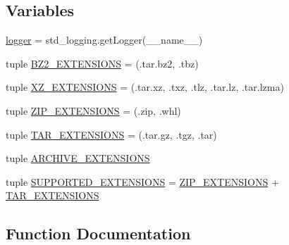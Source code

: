 \subsection*{Variables}
\begin{DoxyCompactItemize}
\item 
\hyperlink{namespacepip_1_1utils_a9d26c744a157c8ff3d40c0666790cf93}{logger} = std\+\_\+logging.\+get\+Logger(\+\_\+\+\_\+name\+\_\+\+\_\+)
\item 
tuple \hyperlink{namespacepip_1_1utils_a4b9cd792af9676fe017d4611bbd9a16c}{B\+Z2\+\_\+\+E\+X\+T\+E\+N\+S\+I\+O\+NS} = (\textquotesingle{}.tar.\+bz2\textquotesingle{}, \textquotesingle{}.tbz\textquotesingle{})
\item 
tuple \hyperlink{namespacepip_1_1utils_ab776027d242c824ea930064697d5abe1}{X\+Z\+\_\+\+E\+X\+T\+E\+N\+S\+I\+O\+NS} = (\textquotesingle{}.tar.\+xz\textquotesingle{}, \textquotesingle{}.txz\textquotesingle{}, \textquotesingle{}.tlz\textquotesingle{}, \textquotesingle{}.tar.\+lz\textquotesingle{}, \textquotesingle{}.tar.\+lzma\textquotesingle{})
\item 
tuple \hyperlink{namespacepip_1_1utils_a6b56f37f702431f30afb3707e351276b}{Z\+I\+P\+\_\+\+E\+X\+T\+E\+N\+S\+I\+O\+NS} = (\textquotesingle{}.zip\textquotesingle{}, \textquotesingle{}.whl\textquotesingle{})
\item 
tuple \hyperlink{namespacepip_1_1utils_a7d0b4b5a632b07cd70ba361d58007a57}{T\+A\+R\+\_\+\+E\+X\+T\+E\+N\+S\+I\+O\+NS} = (\textquotesingle{}.tar.\+gz\textquotesingle{}, \textquotesingle{}.tgz\textquotesingle{}, \textquotesingle{}.tar\textquotesingle{})
\item 
tuple \hyperlink{namespacepip_1_1utils_a54bb36af64463d194144a217519f5901}{A\+R\+C\+H\+I\+V\+E\+\_\+\+E\+X\+T\+E\+N\+S\+I\+O\+NS}
\item 
tuple \hyperlink{namespacepip_1_1utils_a78bf1ba41be552f9aa9c06ddde53f78f}{S\+U\+P\+P\+O\+R\+T\+E\+D\+\_\+\+E\+X\+T\+E\+N\+S\+I\+O\+NS} = \hyperlink{namespacepip_1_1utils_a6b56f37f702431f30afb3707e351276b}{Z\+I\+P\+\_\+\+E\+X\+T\+E\+N\+S\+I\+O\+NS} + \hyperlink{namespacepip_1_1utils_a7d0b4b5a632b07cd70ba361d58007a57}{T\+A\+R\+\_\+\+E\+X\+T\+E\+N\+S\+I\+O\+NS}
\end{DoxyCompactItemize}


\subsection{Function Documentation}
\mbox{\label{namespacepip_1_1utils_afc53f59e9436aac85884b5eb3b77e1c5}} 
